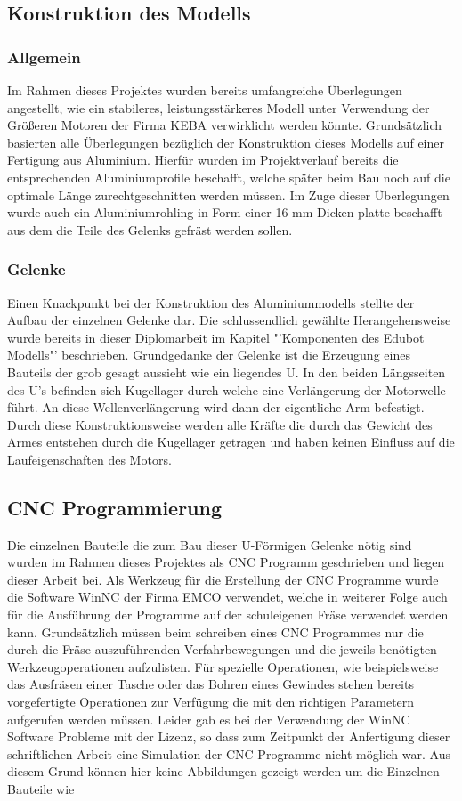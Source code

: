 \subsection{Konstruktion des Modells}
\subsubsection{Allgemein}
Im Rahmen dieses Projektes wurden bereits umfangreiche Überlegungen angestellt, wie ein stabileres, leistungsstärkeres Modell unter Verwendung der Größeren Motoren der Firma KEBA verwirklicht werden könnte.
Grundsätzlich basierten alle Überlegungen bezüglich der Konstruktion dieses Modells auf einer Fertigung aus Aluminium. Hierfür wurden im Projektverlauf bereits die entsprechenden Aluminiumprofile beschafft, welche später beim Bau noch auf die optimale Länge zurechtgeschnitten werden müssen. 
Im Zuge dieser Überlegungen wurde auch ein Aluminiumrohling in Form einer 16 mm Dicken platte beschafft aus dem die Teile des Gelenks gefräst werden sollen.

\subsubsection{Gelenke}
Einen Knackpunkt bei der Konstruktion des Aluminiummodells stellte der Aufbau der einzelnen Gelenke dar. Die schlussendlich gewählte Herangehensweise wurde bereits in dieser Diplomarbeit im Kapitel "'Komponenten des Edubot Modells"' beschrieben. Grundgedanke der Gelenke ist die Erzeugung eines Bauteils der grob gesagt aussieht wie ein liegendes U. In den beiden Längsseiten des U's befinden sich Kugellager durch welche eine Verlängerung der Motorwelle führt. 
An diese Wellenverlängerung wird dann der eigentliche Arm befestigt. Durch diese Konstruktionsweise werden alle Kräfte die durch das Gewicht des Armes entstehen durch die Kugellager getragen und haben keinen Einfluss auf die Laufeigenschaften des Motors.

\subsection{CNC Programmierung}
Die einzelnen Bauteile die zum Bau dieser U-Förmigen Gelenke nötig sind wurden im Rahmen dieses Projektes als CNC Programm geschrieben und liegen dieser Arbeit bei. Als Werkzeug für die Erstellung der CNC Programme wurde die Software WinNC der Firma EMCO verwendet, welche in weiterer Folge auch für die Ausführung der Programme auf der schuleigenen Fräse verwendet werden kann. 
Grundsätzlich müssen beim schreiben eines CNC Programmes nur die durch die Fräse auszuführenden Verfahrbewegungen und die jeweils benötigten Werkzeugoperationen aufzulisten. Für spezielle Operationen, wie beispielsweise das Ausfräsen einer Tasche oder das Bohren eines Gewindes stehen bereits vorgefertigte Operationen zur Verfügung die mit den richtigen Parametern aufgerufen werden müssen.
Leider gab es bei der Verwendung der WinNC Software Probleme mit der Lizenz, so dass zum Zeitpunkt der Anfertigung dieser schriftlichen Arbeit eine Simulation der CNC Programme nicht möglich war. Aus diesem Grund können hier keine Abbildungen gezeigt werden um die Einzelnen Bauteile wie 

